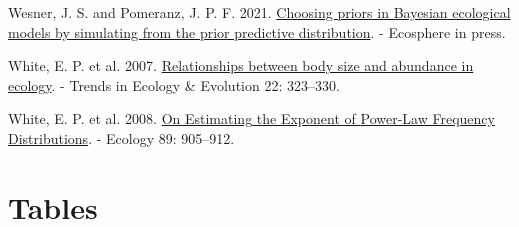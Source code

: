 \documentclass[
  12pt,
]{article}
\newlength{\cslhangindent}
\newlength{\cslentryspacingunit} %
\newenvironment{CSLReferences}[2] %
 {%
  \setlength{\parindent}{0pt}
  \ifodd #1
  \let\oldpar\par
  \def\par{\hangindent=\cslhangindent\oldpar}
  \fi
  \setlength{\parskip}{#2\cslentryspacingunit}
 }%
 {}
\begin{document}
\begin{CSLReferences}{1}{0}
\leavevmode{}%
Wesner, J. S. and Pomeranz, J. P. F. 2021.
\href{https://doi.org/10.1002/ecs2.3739}{Choosing priors in {Bayesian}
ecological models by simulating from the prior predictive distribution}.
- Ecosphere in press.

\leavevmode{}%
White, E. P. et al. 2007.
\href{https://doi.org/10.1016/j.tree.2007.03.007}{Relationships between
body size and abundance in ecology}. - Trends in Ecology \& Evolution
22: 323--330.

\leavevmode{}%
White, E. P. et al. 2008. \href{https://doi.org/10.1890/07-1288.1}{On
{Estimating} the {Exponent} of {Power-Law Frequency Distributions}}. -
Ecology 89: 905--912.

\end{CSLReferences}

\newpage

\hypertarget{tables}{%
\section{Tables}\label{tables}}
\end{document}
